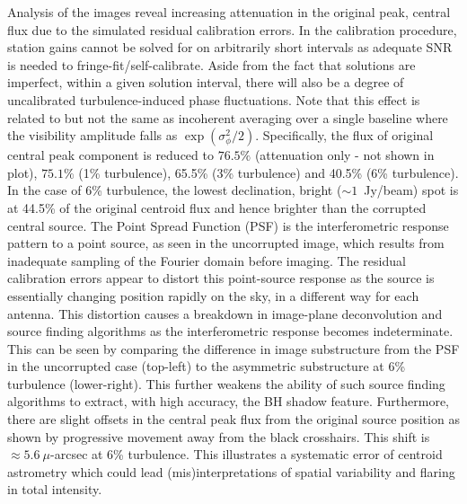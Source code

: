 Analysis of the images reveal increasing attenuation in the original peak, central flux due to the simulated residual calibration errors. In the calibration procedure, station gains cannot be solved for on arbitrarily short intervals as adequate SNR is needed to fringe-fit/self-calibrate. Aside from the fact that solutions are imperfect, within a given solution interval, there will also be a degree of uncalibrated turbulence-induced phase fluctuations. Note that this effect is related to but not the same as incoherent averaging over a single baseline where the visibility amplitude falls as $\exp(\sigma_{\phi}^2/2)$. Specifically, the flux of original central peak component is reduced to $76.5\%$ (attenuation only - not shown in plot), $75.1\%$ (1\% turbulence), 65.5\% (3\% turbulence) and  40.5\% (6\% turbulence). In the case of 6\% turbulence, the lowest declination, bright ($\sim 1$~Jy/beam) spot is at 44.5\% of the original centroid flux and hence brighter than the corrupted central source. 
The Point Spread Function (PSF) is the interferometric response pattern to a point source, as seen in the uncorrupted image, which results from inadequate sampling of the Fourier domain before imaging. The residual calibration errors appear to distort this point-source response as the source is essentially changing position rapidly on the sky, in a different way for each antenna. This distortion causes a breakdown in image-plane deconvolution and source finding algorithms as the interferometric response becomes indeterminate. This can be seen by comparing the difference in image substructure from the PSF in the uncorrupted case (top-left) to the asymmetric substructure at 6\% turbulence (lower-right). This further weakens the ability of such source finding algorithms to extract, with high accuracy, the BH shadow feature.
Furthermore, there are slight offsets in the central peak flux from the original source position as shown by progressive movement away from the black crosshairs. This shift is $\approx 5.6\ \mu$-arcsec at 6\% turbulence. This illustrates a systematic error of centroid astrometry which could lead (mis)interpretations of spatial variability and flaring in total intensity.


